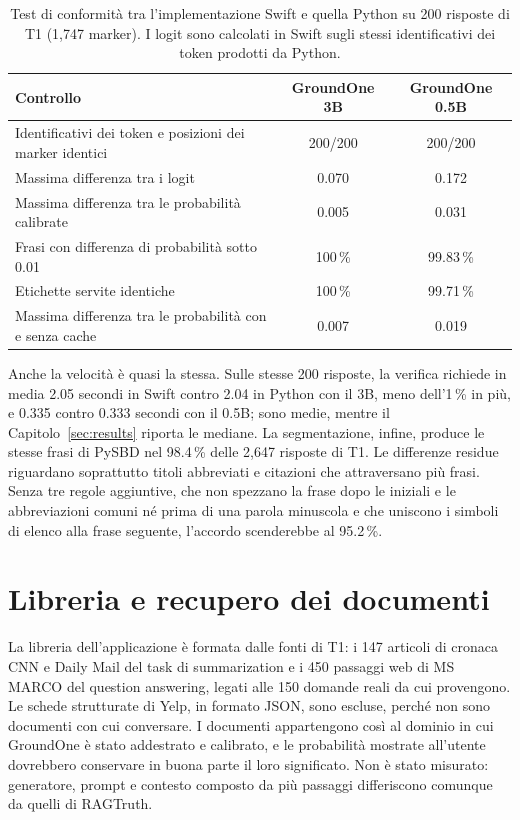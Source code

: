 \begin{table}[htbp]
\centering
\caption{Test di conformità tra l'implementazione Swift e quella Python su 200 risposte di T1 (1{,}747 marker). I logit
sono calcolati in Swift sugli stessi identificativi dei token prodotti da Python.}
\label{tab:studio-conformance}
\small
\begin{tabular}{>{\raggedright\arraybackslash}p{6.6cm}cc}
\toprule
Controllo & GroundOne 3B & GroundOne 0.5B \\
\midrule
Identificativi dei token e posizioni dei marker identici & 200/200 & 200/200 \\
Massima differenza tra i logit & 0.070 & 0.172 \\
Massima differenza tra le probabilità calibrate & 0.005 & 0.031 \\
Frasi con differenza di probabilità sotto 0.01 & 100\,\% & 99.83\,\% \\
Etichette servite identiche & 100\,\% & 99.71\,\% \\
Massima differenza tra le probabilità con e senza cache & 0.007 & 0.019 \\
\bottomrule
\end{tabular}
\end{table}

Anche la velocità è quasi la stessa. Sulle stesse 200 risposte, la verifica richiede in media 2.05 secondi in Swift contro 2.04 in Python con il 3B, meno dell'1\,\% in più, e 0.335 contro 0.333 secondi con il 0.5B; sono medie, mentre il
Capitolo~\ref{sec:results} riporta le mediane. La segmentazione, infine, produce le stesse frasi di PySBD nel 98.4\,\%
delle 2{,}647 risposte di T1. Le differenze residue riguardano soprattutto titoli abbreviati e citazioni che attraversano
più frasi. Senza tre regole aggiuntive, che non spezzano la frase dopo le iniziali e le abbreviazioni comuni né prima di
una parola minuscola e che uniscono i simboli di elenco alla frase seguente, l'accordo scenderebbe al 95.2\,\%.

\section{Libreria e recupero dei documenti}
\label{sec:studio-library}

La libreria dell'applicazione è formata dalle fonti di T1: i 147 articoli di cronaca CNN e Daily Mail del task di
summarization e i 450 passaggi web di MS MARCO del question answering, legati alle 150 domande reali da cui provengono. Le
schede strutturate di Yelp, in formato JSON, sono escluse, perché non sono documenti con cui conversare. I documenti
appartengono così al dominio in cui GroundOne è stato addestrato e calibrato, e le probabilità mostrate all'utente
dovrebbero conservare in buona parte il loro significato. Non è stato misurato: generatore, prompt e contesto composto da
più passaggi differiscono comunque da quelli di RAGTruth.

